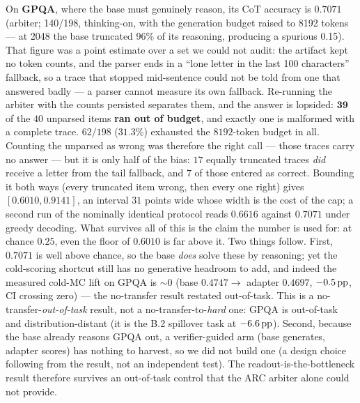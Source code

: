 On \textbf{GPQA}, where the base must genuinely reason, its CoT accuracy is
$\mathbf{0.7071}$ (arbiter; 140/198, thinking-on, with the generation budget raised
to 8192 tokens --- at 2048 the base truncated 96\% of its reasoning, producing a
spurious 0.15). That figure was a point estimate over a set we could not audit: the
artifact kept no token counts, and the parser ends in a ``lone letter in the last 100
characters'' fallback, so a trace that stopped mid-sentence could not be told from one
that answered badly --- a parser cannot measure its own fallback. Re-running the
arbiter with the counts persisted separates them, and the answer is lopsided:
$\mathbf{39}$ of the $40$ unparsed items \textbf{ran out of budget}, and exactly one is
malformed with a complete trace. $62/198$ ($31.3\%$) exhausted the $8192$-token budget
in all. Counting the unparsed as wrong was therefore the right call --- those traces
carry no answer --- but it is only half of the bias: $17$ equally truncated traces
\emph{did} receive a letter from the tail fallback, and $7$ of those entered as
correct. Bounding it both ways (every truncated item wrong, then every one right)
gives $[0.6010, 0.9141]$, an interval $31$ points wide whose width is the cost of the
cap; a second run of the nominally identical protocol reads $0.6616$ against $0.7071$
under greedy decoding. What survives all of this is the claim the number is used for:
at chance $0.25$, even the floor of $0.6010$ is far above it. Two things follow.
First, $0.7071$ is well above chance, so the base
\emph{does} solve these by reasoning; yet the cold-scoring shortcut still has no
generative headroom to add, and indeed the measured cold-MC lift on GPQA is
${\sim}0$ (base $0.4747 \rightarrow$ adapter $0.4697$, $-0.5\,\mathrm{pp}$, CI crossing zero)
--- the no-transfer result restated out-of-task. This is a
no-transfer-\emph{out-of-task} result, not a no-transfer-to-\emph{hard} one: GPQA is
out-of-task and distribution-distant (it is the B.2 spillover task at $-6.6\,\mathrm{pp}$).
Second, because the base already reasons GPQA out, a verifier-guided arm (base
generates, adapter scores) has nothing to harvest, so we did not build one (a design
choice following from the result, not an independent test). The
readout-is-the-bottleneck result therefore survives an out-of-task control that the
ARC arbiter alone could not provide.

